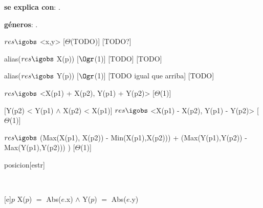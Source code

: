 \begin{Interfaz}
	
	\textbf{se explica con}: .
	
	\textbf{géneros}: .
	
	
	{$res \igobs$ <x,y>}
	[$\Theta$(TODO)]
	[TODO?]
	
	{alias($res \igobs$ X(p))}
	[$\Ogr$(1)]
	[TODO]
	[TODO]
	
	{alias($res \igobs$ Y(p))}
	[$\Ogr$(1)]
	[TODO igual que arriba]
	[TODO]
	
	{$res \igobs$ <X(p1) + X(p2), Y(p1) + Y(p2)>}
	[$\Theta$(1)]
	
	[Y(p2) < Y(p1) $\land$ X(p2) < X(p1)]
	{$res \igobs$ <X(p1) - X(p2), Y(p1) - Y(p2)>}
	[$\Theta$(1)]
	
	{$res  \igobs$ (Max(X(p1), X(p2)) - Min(X(p1),X(p2))) + (Max(Y(p1),Y(p2)) - Max(Y(p1),Y(p2))) )}
	[$\Theta$(1)]
	
\end{Interfaz}

\begin{Representacion}
	
	
	\begin{Estructura}{posicion}[estr]
		\begin{Tupla}[estr]
		\end{Tupla}
	\end{Estructura}
	
	
	~
	
	{$p$}
	{X($p$) $=$ Abs($e$.x) $\land$ Y($p$) $=$ Abs($e$.y)}
	
\end{Representacion}